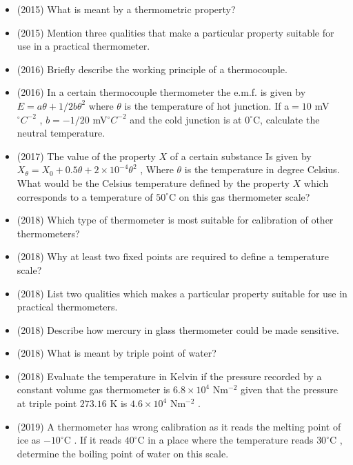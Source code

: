 \documentclass{article}
\begin{document}
\begin{itemize}
\item (2015)  What is meant by a thermometric property?
\item (2015)  Mention three qualities that make a particular property suitable for use in a practical thermometer.
\item (2016)  Briefly describe the working principle of a thermocouple. 
\item (2016)  In a certain thermocouple thermometer the e.m.f. is given by $ E= a \theta + 1/2 b\theta^{2}$ where $ \theta $ is the temperature of hot junction. If a$ =10 $ mV$ ^{\circ}C^{-2}$ , $ b=-1/20 $ mV$ ^{\circ}C^{-2}$ and the cold junction is at $ 0^{\circ}$C, calculate the neutral temperature. 
\item (2017)  The value of the property $ X$ of a certain substance Is given by $ X_{\theta}=X_{0}+0.5\theta +2\times 10^{-4}\theta ^{2}$  , Where $ \theta $ is the temperature in degree Celsius. What would be the Celsius temperature defined by the property $ X$ which corresponds to a temperature of $ 50^{\circ}$C on this gas thermometer scale? 
\item (2018)  Which type of thermometer is most suitable for calibration of other thermometers? 
\item (2018)  Why at least two fixed points are required to define a temperature scale?
\item (2018)  List two qualities which makes a particular property suitable for use in practical thermometers. 
\item (2018)  Describe how mercury in glass thermometer could be made sensitive.
\item (2018)  What is meant by triple point of water? 
\item (2018)  Evaluate the temperature in Kelvin if the pressure recorded by a constant volume gas thermometer is $ 6.8 \times 10^{4}$ Nm$ ^{-2}$ given that the pressure at triple point $ 273.16$ K is $ 4.6 \times 10^{4}$ Nm$ ^{-2}$ .
\item (2019)  A thermometer has wrong calibration as it reads the melting point of ice as $ -10^{\circ}$C . If it reads $ 40^{\circ}$C in a place where the temperature reads $ 30^{\circ}$C ,  determine the boiling point of water on this scale.
\end{itemize}
\end{document}
